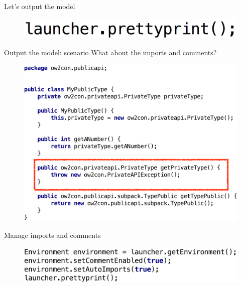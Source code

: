\documentclass{beamer}
\begin{document}
\begin{frame}[c]{Let's output the model}
\begin{figure}
\centering
\includegraphics[width=\textwidth]{figures/output/pretty-print.pdf}
\end{figure}
\end{frame}

\begin{frame}[t]{Output the model: scenario}
What about the imports and comments?
\begin{figure}
\centering
\includegraphics[width=\textwidth]{figures/output/scenario-result-1.pdf}
\end{figure}
\end{frame}

\begin{frame}{Manage imports and comments}

\begin{figure}
\centering
\includegraphics[width=\textwidth]{figures/output/prettyprint-imports-comments.pdf}
\end{figure}
\end{frame}
\end{document}
